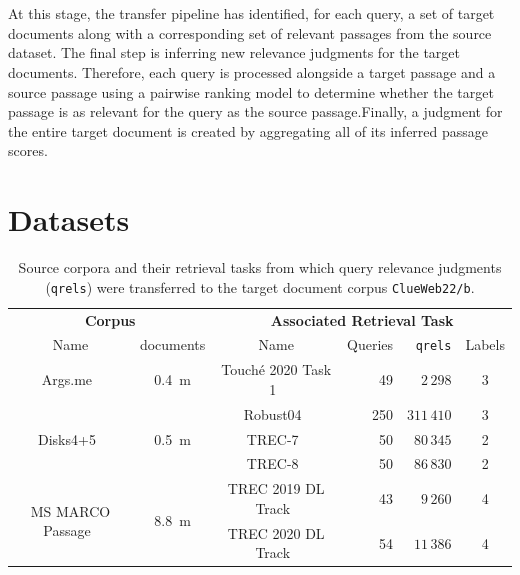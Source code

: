 \\\\
At this stage, the transfer pipeline has identified, for each query, a set of target documents along with a corresponding set of relevant passages from the source dataset. The final step is inferring new relevance judgments for the target documents. Therefore, each query is processed alongside a target passage and a source passage using a pairwise ranking model to determine whether the target passage is as relevant for the query as the source passage.\linebreak Finally, a judgment for the entire target document is created by aggregating all of its inferred passage scores.

\section{Datasets}\label{datasets}

\begin{table}[t]
    \centering
    \footnotesize
    \caption{Source corpora and their retrieval tasks from which query relevance judgments (\texttt{qrels}) were transferred to the target document corpus \texttt{ClueWeb22/b}.}
    \label{tab:datasets}
    \begin{tabular}{cccrrc}
        \toprule
        \multicolumn{2}{c}{\textbf{Corpus}} & \multicolumn{4}{c}{\textbf{ Associated Retrieval Task}} \\
        \cmidrule(lr){1-2} \cmidrule(lr){3-6}
        Name & documents  & Name & Queries &\texttt{qrels} & Labels \\
        \toprule
        
        Args.me~\cite{ajjour:2019} & 0.4~m & Touché 2020 Task 1~\cite{bondarenko:2020} & 49 & $2\,298$ & 3 \\
        \midrule

        \multirow{3}{*}{Disks4+5~\cite{voorhees:1996}} & \multirow{3}{*}{0.5~m} & Robust04~\cite{voorhees:2004} & 250 & $311\,410$ & 3 \\
        & & TREC-7~\cite{voorhees:1998} & 50 & $80\,345$ & 2 \\
        & & TREC-8~\cite{voorhees:1999} & 50 & $86\,830$ & 2 \\
        \midrule

        \multirow{2}{*}{MS MARCO Passage~\cite{bajaj:2016}} & \multirow{2}{*}{8.8~m} & TREC 2019 DL Track~\cite{craswell:2019} & 43 & $9\,260$ & 4 \\
        & & TREC 2020 DL Track~\cite{craswell:2020} & 54 & $11\,386$ & 4 \\
        
        \bottomrule
    \end{tabular}
\end{table}

